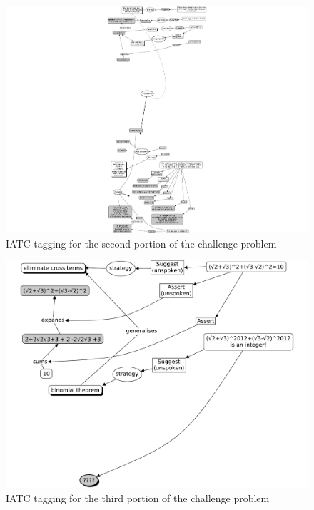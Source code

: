 \documentclass[smallextended,oneside]{svjour3}       %
\begin{document}
\begin{figure}
\includegraphics[width=\textwidth,trim=9cm 15.5cm 9cm 0,clip=true]{./main-strategy.pdf}
\caption{IATC tagging for the second portion of the challenge problem\label{fig:challenge-problem-strategy}}
\end{figure}

\begin{figure}
\includegraphics[width=\textwidth,trim=0cm 8.5cm 0cm 0,clip=true]{./middle-bit.pdf}
\caption{IATC tagging for the third portion of the challenge problem\label{fig:challenge-problem-middle-bit}}
\end{figure}
\end{document}
